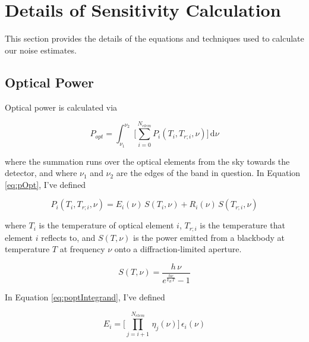 \documentclass[12pt, titlepage]{article} %
\begin{document}

\newpage

\section{Details of Sensitivity Calculation}

This section provides the details of the equations and techniques used to calculate our noise estimates.


\subsection{Optical Power}

Optical power is calculated via

\begin{equation}
	P_{opt} = \int_{\nu_{1}}^{\nu_{2}} \; \Big[ \sum_{i = 0}^{N_{elem}}  P_{i} (T_{i}, T_{r;i}, \nu) \Big] \, \mathrm{d} \nu
	\label{eq:pOpt}
\end{equation}

where the summation runs over the optical elements from the sky towards the detector, and where $\nu_{1}$ and $\nu_{2}$ are the edges of the band in question. In Equation \ref{eq:pOpt}, I've defined 

\begin{equation}
	P_{i} (T_{i}, T_{r;i}, \nu) = E_{i} (\nu) \, S (T_{i}, \nu) + R_{i} (\nu) \, S (T_{r;i}, \nu)
	\label{eq:poptIntegrand}
\end{equation}

where $T_{i}$ is the temperature of optical element $i$, $T_{r;i}$ is the temperature that element $i$ reflects to, and $S(T, \nu)$ is the power emitted from a blackbody at temperature $T$ at frequency $\nu$ onto a diffraction-limited aperture.

\begin{equation}
	S (T, \nu) = \frac{h \, \nu}{e^{\frac{h \nu}{k_{B} \, T}} - 1}
	\label{eq:powIntegrand}
\end{equation}

In Equation \ref{eq:poptIntegrand}, I've defined 

\begin{equation}
	E_{i} = \Big[ \prod_{j = i+1}^{N_{elem}} \, \eta_{j} (\nu) \Big] \, \epsilon_{i} (\nu)
	\label{eq:effEmiss}
\end{equation}
\end{document}

